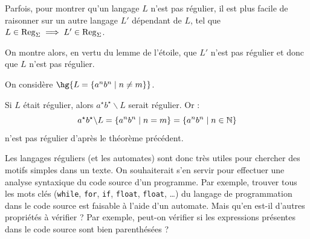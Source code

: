     Parfois, pour montrer qu'un langage $L$ n'est pas régulier, il est plus facile de raisonner sur un autre langage $L'$ dépendant de $L$, tel que $L \in \operatorname{Reg}_\Sigma \implies L' \in \operatorname{Reg}_\Sigma$.
    
    On montre alors, en vertu du lemme de l'étoile, que $L'$ n'est pas régulier et donc que $L$ n'est pas régulier.
    \begin{example}{}{}
        On considère $\hg{L = \ens{a^nb^n \enstq n \neq m}}$.
        
        Si $L$ était régulier, alors $a^\star b^\star \backslash L$ serait régulier. Or :
        \[ a^\star b^\star \backslash L = \left\{a^nb^n \;\middle\vert\; n = m\right\} = \left\{a^nb^n \;\middle\vert\; n \in \mathbb{N}\right\}\]
        n'est pas régulier d'après le théorème précédent.
    \end{example}
    
    Les langages réguliers (et les automates) sont donc très utiles pour chercher des motifs simples dans un texte. On souhaiterait s'en servir pour effectuer une analyse syntaxique du code source d'un programme. Par exemple, trouver tous les mots clés (\texttt{while}, \texttt{for}, \texttt{if}, \texttt{float}, \texttt{float}, \dots) du langage de programmation dans le code source est faisable à l'aide d'un automate. Mais qu'en est-il d'autres propriétés à vérifier ? Par exemple, peut-on vérifier si les expressions présentes dans le code source sont bien parenthésées ?
    

